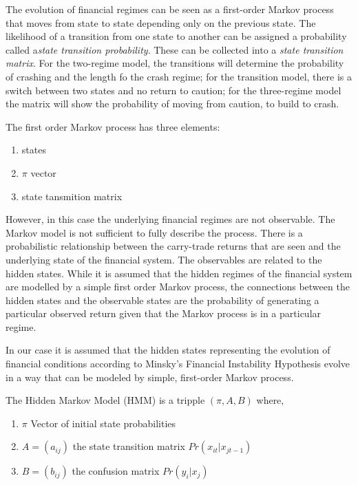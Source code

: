 \documentclass[12pt, a4paper, oneside]{article} %
\begin{document}
The evolution of financial regimes can be seen as a first-order Markov process that moves from state to state depending only on the previous state.  The likelihood of a transition from one state to another can be assigned a probability called a\emph{state transition probability}.  These can be collected into a \emph{state transition matrix}. For the two-regime model, the transitions will determine the probability of crashing and the length fo the crash regime; for the transition model, there is a switch between two states and no return to caution; for the three-regime model the matrix will show the probability of moving from caution, to build to crash.   


The first order Markov process has three elements: 
\begin{enumerate}
\item states
\item $\pi$ vector
\item state tansmition matrix
\end{enumerate}

However, in this case the underlying financial regimes are not observable.  
The Markov model is not sufficient to fully describe the process. There is a probabilistic relationship between the carry-trade returns that are seen and the underlying state of the financial system.  The observables are related to the hidden states. While it is assumed that the hidden regimes of the financial system are modelled by a simple first order Markov process, the connections between the hidden states and the observable states are the probability of generating a particular observed return given that the Markov process is in a particular regime.  
 
In our case it is assumed that the hidden states representing the evolution of financial conditions according to Minsky's Financial Instability Hypothesis evolve in a way that can be modeled by simple, first-order Markov process. 
 
The Hidden Markov Model (HMM) is a tripple $(\pi, A, B)$ where, 
\begin{enumerate}
\item $\pi$ Vector of initial state probabilities
\item $A = (a_{ij})$ the state transition matrix $Pr(x_{it}|x_{jt-1})$
\item $B = (b_{ij})$ the confusion matrix $Pr(y_i|x_j)$
\end{enumerate}
\end{document}
